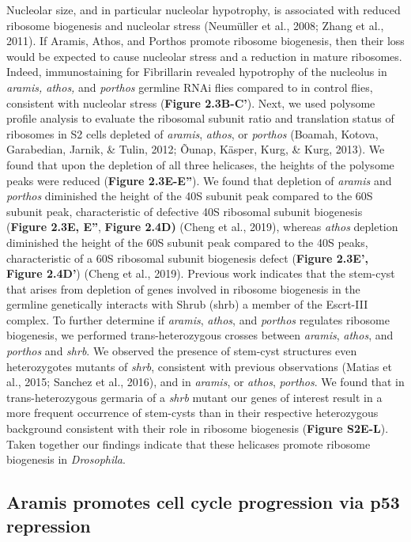 \documentclass[12pt,oneside]{reedthesis}
\begin{document}
Nucleolar size, and in particular nucleolar hypotrophy, is associated
with reduced ribosome biogenesis and nucleolar stress (Neumüller et al., 2008; Zhang et al., 2011). If Aramis, Athos, and Porthos
promote ribosome biogenesis, then their loss would be expected to cause
nucleolar stress and a reduction in mature ribosomes. Indeed,
immunostaining for Fibrillarin revealed hypotrophy of the nucleolus in
\emph{aramis, athos,} and \emph{porthos} germline RNAi flies compared to in
control flies, consistent with nucleolar stress (\textbf{Figure 2.3B-C'}).
Next, we used polysome profile analysis to evaluate the ribosomal
subunit ratio and translation status of ribosomes in S2 cells depleted
of \emph{aramis}, \emph{athos}, or \emph{porthos}
(Boamah, Kotova, Garabedian, Jarnik, \& Tulin, 2012; Õunap, Käsper, Kurg, \& Kurg, 2013).
We found that upon the depletion of all three helicases, the heights of
the polysome peaks were reduced (\textbf{Figure 2.3E-E''}). We found that
depletion of \emph{aramis} and \emph{porthos} diminished the height of the 40S
subunit peak compared to the 60S subunit peak, characteristic of
defective 40S ribosomal subunit biogenesis (\textbf{Figure 2.3E, E''}, \textbf{Figure 2.4D)} (Cheng et al., 2019),
whereas \emph{athos} depletion
diminished the height of the 60S subunit peak compared to the 40S peaks,
characteristic of a 60S ribosomal subunit biogenesis defect (\textbf{Figure 2.3E', Figure 2.4D'}) (Cheng et al., 2019).
Previous work indicates that the stem-cyst that arises from depletion of genes
involved in ribosome biogenesis in the germline genetically interacts
with Shrub (shrb) a member of the Escrt-III complex. To further
determine if \emph{aramis}, \emph{athos}, and \emph{porthos} regulates ribosome
biogenesis, we performed trans-heterozygous crosses between \emph{aramis},
\emph{athos}, and \emph{porthos} and \emph{shrb}. We observed the presence of stem-cyst
structures even heterozygotes mutants of \emph{shrb}, consistent with
previous observations (Matias et al., 2015; Sanchez et al., 2016), and in
\emph{aramis}, or \emph{athos}, \emph{porthos}. We found that in trans-heterozygous
germaria of a \emph{shrb} mutant our genes of interest result in a more
frequent occurrence of stem-cysts than in their respective heterozygous
background consistent with their role in ribosome biogenesis (\textbf{Figure
S2E-L}). Taken together our findings indicate that these helicases
promote ribosome biogenesis in \emph{Drosophila}.

\hypertarget{aramis-promotes-cell-cycle-progression-via-p53-repression}{%
\subsection{Aramis promotes cell cycle progression via p53 repression}\label{aramis-promotes-cell-cycle-progression-via-p53-repression}}
\end{document}
